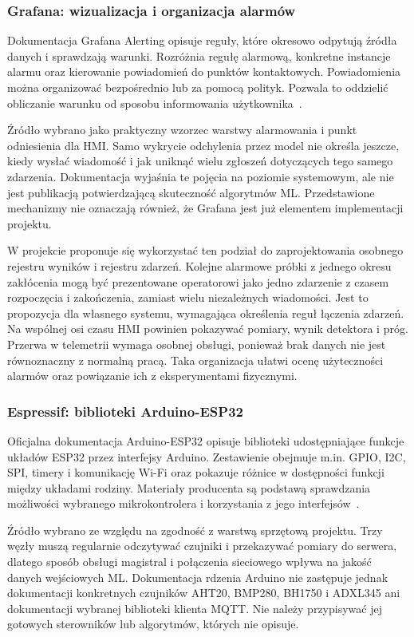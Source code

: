 \documentclass[12pt,a4paper]{article}
\begin{document}
\subsubsection{Grafana: wizualizacja i organizacja alarmów}
Dokumentacja Grafana Alerting opisuje reguły, które okresowo odpytują
źródła danych i sprawdzają warunki. Rozróżnia regułę alarmową, konkretne
instancje alarmu oraz kierowanie powiadomień do punktów kontaktowych.
Powiadomienia można organizować bezpośrednio lub za pomocą polityk.
Pozwala to oddzielić obliczanie warunku od sposobu informowania
użytkownika~\cite{grafana_docs}.

Źródło wybrano jako praktyczny wzorzec warstwy alarmowania i punkt
odniesienia dla HMI. Samo wykrycie odchylenia przez model nie określa
jeszcze, kiedy wysłać wiadomość i jak uniknąć wielu zgłoszeń dotyczących
tego samego zdarzenia. Dokumentacja wyjaśnia te pojęcia na poziomie
systemowym, ale nie jest publikacją potwierdzającą skuteczność
algorytmów ML. Przedstawione mechanizmy nie oznaczają również, że
Grafana jest już elementem implementacji projektu.

W projekcie proponuje się wykorzystać ten podział do zaprojektowania
osobnego rejestru wyników i rejestru zdarzeń. Kolejne alarmowe próbki
z jednego okresu zakłócenia mogą być prezentowane operatorowi jako
jedno zdarzenie z czasem rozpoczęcia i zakończenia, zamiast wielu
niezależnych wiadomości. Jest to propozycja dla własnego systemu,
wymagająca określenia reguł łączenia zdarzeń. Na wspólnej osi czasu
HMI powinien pokazywać pomiary, wynik detektora i próg. Przerwa
w telemetrii wymaga osobnej obsługi, ponieważ brak danych nie
jest równoznaczny z normalną pracą. Taka organizacja ułatwi ocenę
użyteczności alarmów oraz powiązanie ich z eksperymentami fizycznymi.

\subsubsection{Espressif: biblioteki Arduino-ESP32}
Oficjalna dokumentacja Arduino-ESP32 opisuje biblioteki udostępniające
funkcje układów ESP32 przez interfejsy Arduino. Zestawienie obejmuje
m.in. GPIO, I2C, SPI, timery i komunikację Wi-Fi oraz pokazuje różnice
w dostępności funkcji między układami rodziny. Materiały producenta
są podstawą sprawdzania możliwości wybranego mikrokontrolera
i korzystania z jego interfejsów~\cite{espressif_docs}.

Źródło wybrano ze względu na zgodność z warstwą sprzętową projektu.
Trzy węzły muszą regularnie odczytywać czujniki i przekazywać
pomiary do serwera, dlatego sposób obsługi magistral i połączenia
sieciowego wpływa na jakość danych wejściowych ML. Dokumentacja
rdzenia Arduino nie zastępuje jednak dokumentacji konkretnych
czujników AHT20, BMP280, BH1750 i ADXL345 ani dokumentacji
wybranej biblioteki klienta MQTT. Nie należy przypisywać jej
gotowych sterowników lub algorytmów, których nie opisuje.
\end{document}
